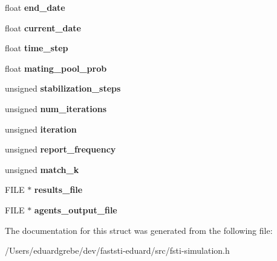 \begin{DoxyCompactItemize}
float {\bfseries end\+\_\+date}
\item 
\mbox{\label{structfsti__simulation_a79f4bbb55b32e131cafcdb6697ab4768}} 
float {\bfseries current\+\_\+date}
\item 
\mbox{\label{structfsti__simulation_a650011fbab62704c39b65cdd8cdb3a3d}} 
float {\bfseries time\+\_\+step}
\item 
\mbox{\label{structfsti__simulation_a35c0d7aba210250a4b0d834ed6dfe5c6}} 
float {\bfseries mating\+\_\+pool\+\_\+prob}
\item 
\mbox{\label{structfsti__simulation_aaddd9220a10295d24f5c6a50f7f1727c}} 
unsigned {\bfseries stabilization\+\_\+steps}
\item 
\mbox{\label{structfsti__simulation_a5ec800c5ca8fb82bbdbe45743a3571a9}} 
unsigned {\bfseries num\+\_\+iterations}
\item 
\mbox{\label{structfsti__simulation_a1455e197a5df3af32d96438c784d0bd5}} 
unsigned {\bfseries iteration}
\item 
\mbox{\label{structfsti__simulation_a933d795a18a61dccea12db86da0e120b}} 
unsigned {\bfseries report\+\_\+frequency}
\item 
\mbox{\label{structfsti__simulation_abbe99680ea150fa87b562f12fed6a088}} 
unsigned {\bfseries match\+\_\+k}
\item 
\mbox{\label{structfsti__simulation_aee76cdc2d8e408930d2801b9d6099c51}} 
F\+I\+LE $\ast$ {\bfseries results\+\_\+file}
\item 
\mbox{\label{structfsti__simulation_ab9a74be6298bbfe4ea5d2bbdbeef3b95}} 
F\+I\+LE $\ast$ {\bfseries agents\+\_\+output\+\_\+file}
\end{DoxyCompactItemize}


The documentation for this struct was generated from the following file\+:\begin{DoxyCompactItemize}
\item 
/\+Users/eduardgrebe/dev/faststi-\/eduard/src/fsti-\/simulation.\+h\end{DoxyCompactItemize}
